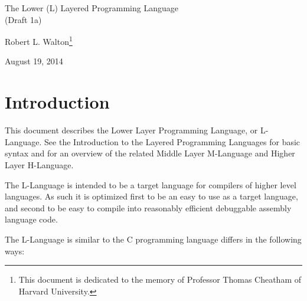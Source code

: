 \documentclass[12pt]{article}
\makeatletter
\renewcommand\tableofcontents{%
    \begin{list}{}%
	     {\setlength{\itemsep}{0in}%
	      \setlength{\topsep}{0in}%
	      \setlength{\parsep}{1ex}%
	      \setlength{\labelwidth}{0in}%
	      \setlength{\baselineskip}{1.5ex}%
	      \setlength{\leftmargin}{1.0in}%
	      \setlength{\rightmargin}{1.0in}}%
    \item\@starttoc{toc}%
    \end{list}}
\makeatother
\begin{document}
        
\begin{center}

{\Large
The Lower (L) Layered Programming Language \\[0.5ex]
(Draft 1a)}

\medskip

Robert L. Walton\footnote{This document is dedicated to the memory
of Professor Thomas Cheatham of Harvard University.}

August 19, 2014
 
\end{center}

{\small \tableofcontents}

\newpage

\section{Introduction}

This document describes the Lower Layer Programming Language, or
L-Language.  See the Introduction to the Layered
Programming Languages for basic syntax and for an overview of the related
Middle Layer M-Language and Higher Layer H-Language.

The L-Language is intended to be a target language for compilers of
higher level languages.  As such it is optimized first to be an easy to 
use as a target language, and second to be easy to
compile into reasonably efficient debuggable assembly language code.

The L-Language is similar to the C programming language
differs in the following ways:
\end{document}
